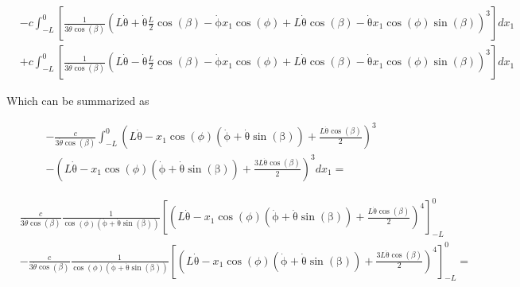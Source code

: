 \begin{equation}
    \begin{split}
        &-c\int_{-L}^0
        \left[\frac{1}{3\dot\theta\cos(\beta)}{\left(L\mathrm{\dot{\theta}}+\mathrm{\dot{\theta}}\frac{L}{2}\cos\left(\beta \right)-\mathrm{\dot{\phi}}x_{1}\cos\left(\phi \right)+L\mathrm{\dot{\theta}}\cos\left(\beta \right)-\mathrm{\dot{\theta}}x_{1}\cos\left(\phi \right)\sin\left(\beta \right)\right)}^3\right]
        dx_1\\
        & +c\int_{-L}^0
        \left[\frac{1}{3\dot\theta\cos(\beta)}{\left(L\mathrm{\dot{\theta}}-\mathrm{\dot{\theta}}\frac{L}{2}\cos\left(\beta \right)-\mathrm{\dot{\phi}}x_{1}\cos\left(\phi \right)+L\mathrm{\dot{\theta}}\cos\left(\beta \right)-\mathrm{\dot{\theta}}x_{1}\cos\left(\phi \right)\sin\left(\beta \right)\right)}^3\right]
        dx_1
    \end{split}
\end{equation}

Which can be summarized as

\begin{equation}
    \begin{split}
        &-\frac{c}{3\dot\theta\cos(\beta)}\int_{-L}^0
        \left(L\mathrm{\dot\theta}-x_{1}\cos\left(\phi \right)\left(\mathrm{\dot\phi}+\mathrm{\dot\theta\sin(\beta)}\right)
        +\frac{L\mathrm{\dot\theta}\cos\left(\beta \right)}{2}\right)^3\\
        &-\left(L\mathrm{\dot\theta}-x_{1}\cos\left(\phi \right)\left(\mathrm{\dot\phi}+\mathrm{\dot\theta\sin(\beta)}\right)+\frac{3L\mathrm{\dot\theta}\cos\left(\beta \right)}{2}\right)^3dx_1 =
    \end{split}
\end{equation}


\begin{equation}
    \begin{split}
        &\frac{c}{3\dot\theta\cos(\beta)}\frac{1}{\cos\left(\phi \right)\left(\mathrm{\dot\phi}+\mathrm{\dot\theta\sin(\beta)}\right)}
        \left[\left(L\mathrm{\dot\theta}-x_{1}\cos\left(\phi \right)\left(\mathrm{\dot\phi}+\mathrm{\dot\theta\sin(\beta)}\right)
        +\frac{L\mathrm{\dot\theta}\cos\left(\beta \right)}{2}\right)^4\right]_{-L}^0\\
        &-\frac{c}{3\dot\theta\cos(\beta)}\frac{1}{\cos\left(\phi \right)\left(\mathrm{\dot\phi}+\mathrm{\dot\theta\sin(\beta)}\right)}
        \left[\left(L\mathrm{\dot\theta}-x_{1}\cos\left(\phi \right)\left(\mathrm{\dot\phi}+\mathrm{\dot\theta\sin(\beta)}\right)+\frac{3L\mathrm{\dot\theta}\cos\left(\beta \right)}{2}\right)^4\right]_{-L}^0 =
    \end{split}
\end{equation}

